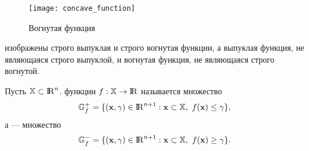 \begin{figure} \centering
   \texttt{[image: concave\_function]}\\
  \caption{Вогнутая функция}\label{fig:concave-function}
\end{figure}


     изображены строго выпуклая и строго вогнутая функции, а выпуклая функция,
    не являющаяся строго выпуклой, и вогнутая функция, не являющаяся строго вогнутой.



\begin{dfn}
    Пусть $\mathbb{X}\subset{\rm I\!R}^{n}$.
  функции $f:\mathbb{X}\rightarrow {\rm I\!R}$ называется множество
    \[
    \mathbb{G}_{f}^+=\{ (\mathbf{x}, \gamma) \in {\rm I\!R}^{n+1}: \mathbf{x}\subset\mathbb{X}, \
    f(\mathbf{x}) \leq \gamma \},
    \]
    а  --- множество
    \[
    \mathbb{G}_{f}^- =\{ (\mathbf{x}, \gamma) \in {\rm I\!R}^{n+1}: \mathbf{x}\subset\mathbb{X}, \
    f(\mathbf{x}) \geq \gamma \}.
    \]
\end{dfn}




